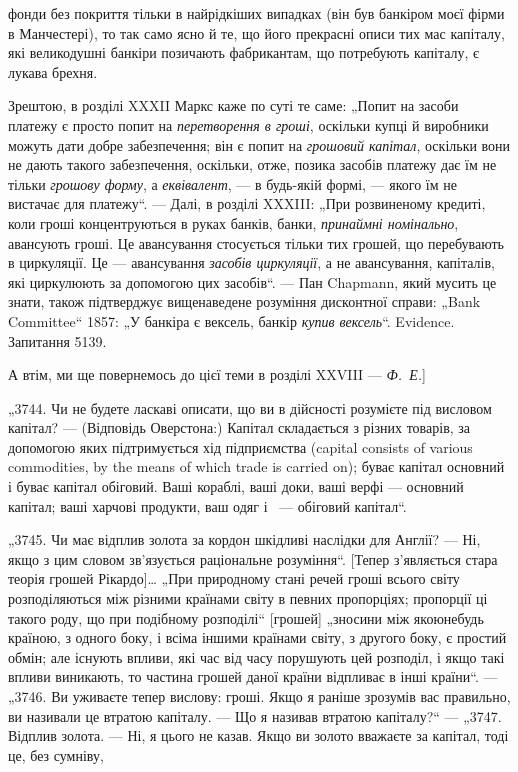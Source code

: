 \parcont{}  %
фонди без покриття тільки в найрідкіших випадках (він був
банкіром моєї фірми в Манчестері), то так само ясно й те, що
його прекрасні описи тих мас капіталу, які великодушні банкіри
позичають фабрикантам, що потребують капіталу, є лукава
брехня.

Зрештою, в розділі XXXII Маркс каже по суті те саме:
„Попит на засоби платежу є просто попит на \emph{перетворення в
гроші}, оскільки купці й виробники можуть дати добре забезпечення; він є попит на \emph{грошовий капітал},
оскільки вони не
дають такого забезпечення, оскільки, отже, позика засобів платежу дає їм не тільки \emph{грошову форму}, а
\emph{еквівалент}, — в будь-якій формі, — якого їм не вистачає для платежу“. — Далі,
в розділі XXXIII: „При розвиненому кредиті, коли гроші концентруються в руках банків, банки,
\emph{принаймні номінально}, авансують гроші. Це авансування стосується тільки тих грошей,
що перебувають
в циркуляції. Це — авансування \emph{засобів
циркуляції}, а не авансування, капіталів, які циркулюють за допомогою цих засобів“. — Пан Chapmann,
який мусить це знати,
також підтверджує вищенаведене розуміння дисконтної справи:
„Bank Committee“ 1857: „У банкіра є вексель, банкір \emph{купив вексель}“. Evidence. Запитання 5139.

А втім, ми ще повернемось до цієї теми в розділі
XXVIII — \emph{Ф.~Е.}]

„3744. Чи не будете ласкаві описати, що ви в дійсності розумієте під висловом капітал? — (Відповідь
Оверстона:) Капітал
складається з різних товарів, за допомогою яких підтримується
хід підприємства (capital consists of various commodities, by the
means of which trade is carried on); буває капітал основний і буває капітал обіговий. Ваші кораблі,
ваші доки, ваші верфі —
основний капітал; ваші харчові продукти, ваш одяг і~ — обіговий капітал“.

„3745. Чи має відплив золота за кордон шкідливі наслідки для
Англії? — Ні, якщо з цим словом зв’язується раціональне розуміння“. [Тепер з’являється стара теорія
грошей Рікардо]\dots{} „При
природному стані речей гроші всього світу розподіляються між
різними країнами світу в певних пропорціях; пропорції ці такого
роду, що при подібному розподілі“ [грошей] „зносини між якоюнебудь країною, з одного боку, і всіма
іншими країнами світу, з другого боку, є простий обмін; але існують впливи, які час
від часу порушують цей розподіл, і якщо такі впливи виникають,
то частина грошей даної країни відпливає в інші країни“. — „3746.
Ви уживаєте тепер вислову: гроші. Якщо я раніше зрозумів вас
правильно, ви називали це втратою капіталу. — Що я називав
втратою капіталу?“ — „3747. Відплив золота. — Ні, я цього не
казав. Якщо ви золото вважаєте за капітал, тоді це, без сумніву,
\parbreak{}  %
